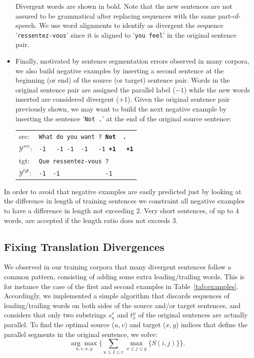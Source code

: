 \documentclass[11pt,a4paper]{article}
\begin{document}
\begin{itemize}
Divergent words are shown in bold. 
Note that the new sentences are not assured to be grammatical after replacing sequences with the same part-of-speech.
We use word alignments to identify as divergent the sequence '\texttt{ressentez-vous}' since it is aligned to '\texttt{you feel}' in the original sentence pair.

\item Finally, motivated by sentence segmentation errors observed in many corpora, we also build negative examples by inserting a second sentence at the beginning (or end) of the source (or target) sentence pair. 
Words in the original sentence pair are assigned the parallel label ($-1$) while the new words inserted are considered divergent ($+1$).
Given the original sentence pair previously shown, we may want to build the next negative example by inserting the sentence '\texttt{Not .}' at the end of the original source sentence:

\begin{table}[h]
\center
\begin{tabular}{ll}
src: & { \small \texttt{What do you want ? {\bf Not \ .}}} \\
$\mathcal{Y}^{src}$: & { \small \texttt{-1 \ \  -1 -1 \ -1  \ \ -1 {\bf +1\ \ \  +1}}} \\
tgt: & { \small \texttt{Que ressentez-vous ?}} \\
$\mathcal{Y}^{tgt}$: & { \small \texttt{-1\ \ -1\ \ \ \ \ \ \ \ \ \ \ \ \ -1}} \\
\end{tabular}
\end{table}

\end{itemize}

In order to avoid that negative examples are easily predicted just by looking at the difference in length of training sentences we constraint all negative examples to have a difference in length not exceeding $2$. Very short sentences, of up to $4$ words, are accepted if the length ratio does not exceeds $3$.

\subsection{Fixing Translation Divergences}
\label{correction}

We observed in our training corpora that many divergent sentences follow a common pattern, consisting of adding some extra leading/trailing words.
This is for instance the case of the first and second examples in Table~\ref{tab:examples}.
Accordingly, we implemented a simple algorithm that discards sequences
of leading/trailing words on both sides of the source and/or target
sentences, and considers that only two substrings $s_u^v$ and $t_x^y$
of the original sentences are actually parallel.
To find the optimal source ($u, v$) and target ($x, y$) indices that
define the parallel segments in the original sentence, we solve:
\begin{equation*}
\underset{u, v, x, y}{\arg\max} \Big \{      \underset{u \le I \le v}{\sum} \underset{x \le j \le y}{\max} \{ S(i,j) \}    \Big \}.
\end{equation*}
\end{document}
